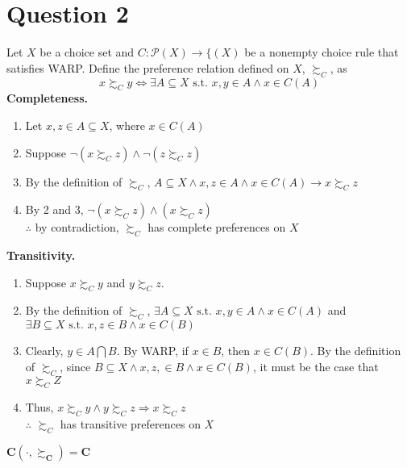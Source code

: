 \documentclass{article}
\newcommand{\intersect}{\bigcap}
\renewcommand{\P}{\mathcal{P}}
\begin{document}
\pagebreak
\section*{Question 2}
Let $X$ be a choice set and $C:\P(X)\rightarrow\{(X)$ be a nonempty choice rule that satisfies WARP. Define the preference relation defined on $X$, $\succsim_C$, as
\[
	x\succsim_C y \iff \exists A\subseteq X\text{ s.t. } x,y\in A\land x\in C(A)
\]
\textbf{Completeness.}
\begin{enumerate}
	\item Let $x,z\in A\subseteq X$, where $x\in C(A)$
	
	\item Suppose $\neg(x\succsim_C z)\land\neg(z\succsim_C z)$
	
	\item By the definition of $\succsim_C$, $A\subseteq X\land x,z\in A\land x\in C(A)\rightarrow x\succsim_C z$ 
	
	\item By 2 and 3, $\neg(x\succsim_C z)\land (x\succsim_C z)$
	\medskip \\
	$\therefore$ by contradiction, $\succsim_C$ has complete preferences on $X$
	
\end{enumerate}
\textbf{Transitivity.}
\begin{enumerate}
	\item Suppose $x\succsim_C y$ and $y\succsim_C z$.
	
	\item By the definition of $\succsim_C$, $\exists A\subseteq X\text{ s.t. } x,y\in A\land x\in C(A)$ and $\exists B\subseteq X\text{ s.t. } x,z\in B\land x\in C(B)$
	
	\item Clearly, $y\in A\intersect B$. By WARP, if $x\in B$, then $x\in C(B)$. By the definition of $\succsim_C$, since $B\subseteq X\land x,z,\in B\land x\in C(B)$, it must be the case that $x\succsim_C Z$
	
	\item Thus, $x\succsim_C y \land y\succsim_C z \Rightarrow x\succsim_C z$
	\medskip \\
	$\therefore$ $\succsim_C$ has transitive preferences on $X$
	
\end{enumerate}
$\mathbf{C\left(\cdot,\succsim_C\right)=C}$
\end{document}
